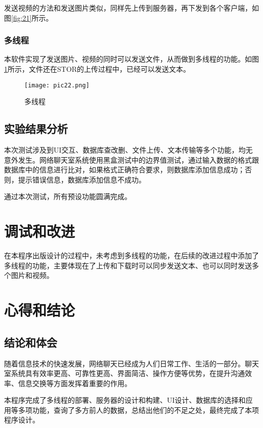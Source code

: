 \documentclass[forprint]{OSPaper}
\begin{document}
发送视频的方法和发送图片类似，同样先上传到服务器，再下发到各个客户端，如图\ref{fig:21}所示。

\subsection{多线程}

本软件实现了发送图片、视频的同时可以发送文件，从而做到多线程的功能。如图\ref{fig:22}所示，文件还在STOR的上传过程中，已经可以发送文本。

\begin{figure}[!htbp]
	\centering
	\texttt{[image: pic22.png]}
	\caption{多线程}
	\label{fig:22}
\end{figure}

\section{实验结果分析}

本次测试涉及到UI交互、数据库查改删、文件上传、文本传输等多个功能，均无意外发生。网络聊天室系统使用黑盒测试中的边界值测试，通过输入数据的格式跟数据库中的信息进行比对，如果格式正确符合要求，则数据库添加信息成功；否则，提示错误信息，数据库添加信息不成功。

通过本次测试，所有预设功能圆满完成。

\chapter{调试和改进}

在本程序出版设计的过程中，未考虑到多线程的功能，在后续的改进过程中添加了多线程的功能，主要体现在了上传和下载时可以同步发送文本、也可以同时发送多个图片和视频。

\chapter{心得和结论}

\section{结论和体会}

随着信息技术的快速发展，网络聊天已经成为人们日常工作、生活的一部分。聊天室系统具有效率更高、可靠性更高、界面简洁、操作方便等优势，在提升沟通效率、信息交换等方面发挥着重要的作用。

本程序完成了多线程的部署、服务器的设计和构建、UI设计、数据库的选择和应用等多项功能，查询了多方前人的数据，总结出他们的不足之处，最终完成了本项程序设计。
\end{document}
